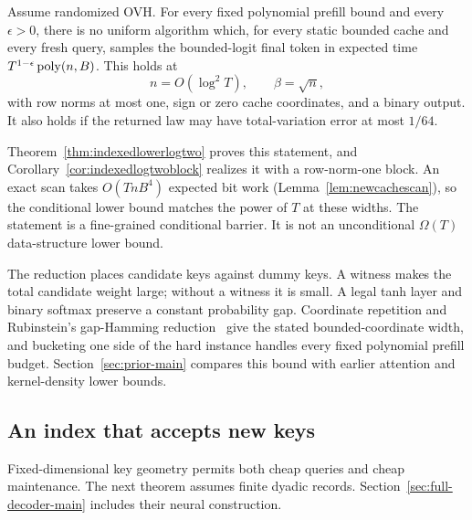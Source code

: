 \begin{theorem}
\label{thm:main-index-hard}
Assume randomized OVH. For every fixed polynomial prefill bound
and every $\epsilon>0$, there is no uniform algorithm which,
for every static bounded cache and every fresh query, samples the
bounded-logit final token in expected time
$T^{1-\epsilon}\operatorname{poly}(n,B)$.
This holds at
\[
 n=O(\log^2T),\qquad \beta=\sqrt n,
\]
with row norms at most one, sign or zero cache coordinates, and
a binary output. It also holds if the returned law may have
total-variation error at most $1/64$.
\end{theorem}

Theorem~\ref{thm:indexedlowerlogtwo} proves this statement, and
Corollary~\ref{cor:indexedlogtwoblock} realizes it with a row-norm-one
block. An exact scan takes $O(TnB^4)$ expected bit work
(Lemma~\ref{lem:newcachescan}), so the conditional
lower bound matches the power of $T$ at these widths. The statement
is a fine-grained conditional barrier. It is not an unconditional
$\Omega(T)$ data-structure lower bound.

The reduction places candidate keys against dummy keys. A witness
makes the total candidate weight large; without a witness it is
small. A legal tanh layer and binary softmax preserve a constant
probability gap. Coordinate repetition and Rubinstein's
gap-Hamming reduction~\cite{rubinstein2018ann} give the stated
bounded-coordinate width, and bucketing one side of the hard instance
handles every fixed polynomial prefill budget.
Section~\ref{sec:prior-main} compares this bound with earlier
attention and kernel-density lower bounds.

\subsection{An index that accepts new keys}

Fixed-dimensional key geometry permits both cheap queries and
cheap maintenance. The next theorem assumes finite dyadic records.
Section~\ref{sec:full-decoder-main} includes their neural construction.

